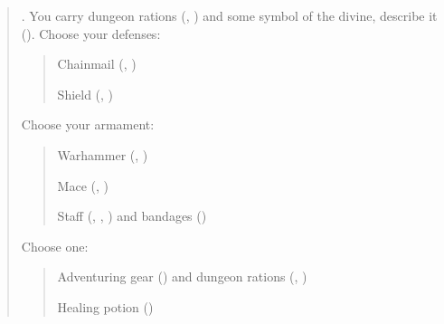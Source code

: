 \documentclass[8pt]{extarticle}
\begin{document}
\begin{multicols}{2}

  \begin{quote}
    . You carry dungeon rations (,
    ) and some symbol of the divine, describe it
    (). Choose your defenses:

    \begin{quote}
      \Checkbox{6pt} Chainmail (, )

    \Checkbox{6pt} Shield (, )
    \end{quote}

    Choose your armament:
    \begin{quote}
    \Checkbox{6pt} Warhammer (, )

    \Checkbox{6pt} Mace (, )

    \Checkbox{6pt} Staff (, ,
    ) and bandages ()
    \end{quote}

    Choose one:
    \begin{quote}
      \Checkbox{6pt} Adventuring gear () and dungeon
      rations (, )

      \Checkbox{6pt} Healing potion ()
    \end{quote}
\end{quote}

\columnbreak

\ 

\end{multicols}

\end{document}
